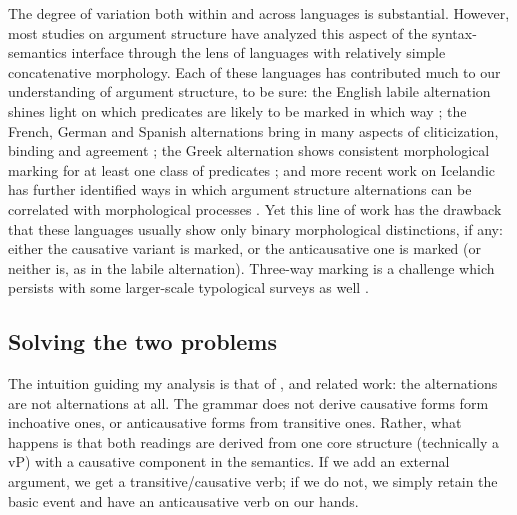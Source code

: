 \begin{exe}
\begin{xlist}
\begin{exe}
\begin{exe}
\begin{exe}
\begin{exe}
\begin{xlist}
\begin{exe}
\begin{xlist}
\begin{xlist}
\begin{xlist}
\begin{exe}
\begin{xlist}
The degree of variation both within and across languages is substantial. However, most studies on argument structure have analyzed this aspect of the syntax-semantics interface through the lens of languages with relatively simple concatenative morphology. Each of these languages has contributed much to our understanding of argument structure, to be sure: the English labile alternation shines light on which predicates are likely to be marked in which way \citep{haspelmath93,unaccusativity95,koontzgarboden09}; the French, German and Spanish alternations bring in many aspects of cliticization, binding and agreement \citep{labelle08,schaefer08,cuervo14}; the Greek alternation shows consistent morphological marking for at least one class of predicates \citep{alexiadoudoron12,layering15}; and more recent work on Icelandic has further identified ways in which argument structure alternations can be correlated with morphological processes \citep{wood14nllt,wood15springer,wood16roots}. Yet this line of work has the drawback that these languages usually show only binary morphological distinctions, if any: either the causative variant is marked, or the anticausative one is marked (or neither is, as in the labile alternation). Three-way marking is a challenge which persists with some larger-scale typological surveys as well \citep{haspelmath93,arad05}.

	\subsection{Solving the two problems}
The intuition guiding my analysis is that of \cite{schaefer08}, \cite{layering15} and related work: the alternations are not alternations at all. The grammar does not derive causative forms form inchoative ones, or anticausative forms from transitive ones. Rather, what happens is that both readings are derived from one core structure (technically a vP) with a causative component in the semantics. If we add an external argument, we get a transitive/causative verb; if we do not, we simply retain the basic event and have an anticausative verb on our hands.


\end{xlist}
\end{exe}
\end{xlist}
\end{xlist}
\end{xlist}
\end{exe}
\end{xlist}
\end{exe}
\end{exe}
\end{exe}
\end{exe}
\end{xlist}
\end{exe}

